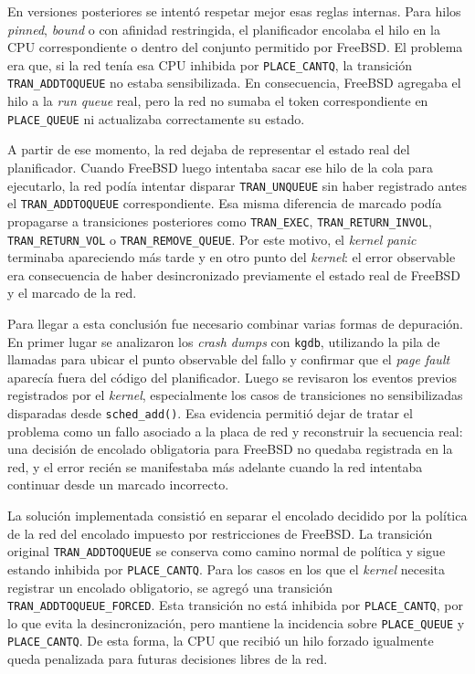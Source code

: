 En versiones posteriores se intentó respetar mejor esas reglas internas. Para hilos \textit{pinned}, \textit{bound} o con afinidad restringida, el planificador encolaba el hilo en la CPU correspondiente o dentro del conjunto permitido por FreeBSD. El problema era que, si la red tenía esa CPU inhibida por \verb|PLACE_CANTQ|, la transición \verb|TRAN_ADDTOQUEUE| no estaba sensibilizada. En consecuencia, FreeBSD agregaba el hilo a la \textit{run queue} real, pero la red no sumaba el token correspondiente en \verb|PLACE_QUEUE| ni actualizaba correctamente su estado.\par

A partir de ese momento, la red dejaba de representar el estado real del planificador. Cuando FreeBSD luego intentaba sacar ese hilo de la cola para ejecutarlo, la red podía intentar disparar \verb|TRAN_UNQUEUE| sin haber registrado antes el \verb|TRAN_ADDTOQUEUE| correspondiente. Esa misma diferencia de marcado podía propagarse a transiciones posteriores como \verb|TRAN_EXEC|, \verb|TRAN_RETURN_INVOL|, \verb|TRAN_RETURN_VOL| o \verb|TRAN_REMOVE_QUEUE|. Por este motivo, el \textit{kernel panic} terminaba apareciendo más tarde y en otro punto del \textit{kernel}: el error observable era consecuencia de haber desincronizado previamente el estado real de FreeBSD y el marcado de la red.\par

Para llegar a esta conclusión fue necesario combinar varias formas de depuración. En primer lugar se analizaron los \textit{crash dumps} con \texttt{kgdb}, utilizando la pila de llamadas para ubicar el punto observable del fallo y confirmar que el \textit{page fault} aparecía fuera del código del planificador. Luego se revisaron los eventos previos registrados por el \textit{kernel}, especialmente los casos de transiciones no sensibilizadas disparadas desde \verb|sched_add()|. Esa evidencia permitió dejar de tratar el problema como un fallo asociado a la placa de red y reconstruir la secuencia real: una decisión de encolado obligatoria para FreeBSD no quedaba registrada en la red, y el error recién se manifestaba más adelante cuando la red intentaba continuar desde un marcado incorrecto.\par

La solución implementada consistió en separar el encolado decidido por la política de la red del encolado impuesto por restricciones de FreeBSD. La transición original \verb|TRAN_ADDTOQUEUE| se conserva como camino normal de política y sigue estando inhibida por \verb|PLACE_CANTQ|. Para los casos en los que el \textit{kernel} necesita registrar un encolado obligatorio, se agregó una transición \verb|TRAN_ADDTOQUEUE_FORCED|. Esta transición no está inhibida por \verb|PLACE_CANTQ|, por lo que evita la desincronización, pero mantiene la incidencia sobre \verb|PLACE_QUEUE| y \verb|PLACE_CANTQ|. De esta forma, la CPU que recibió un hilo forzado igualmente queda penalizada para futuras decisiones libres de la red.\par

